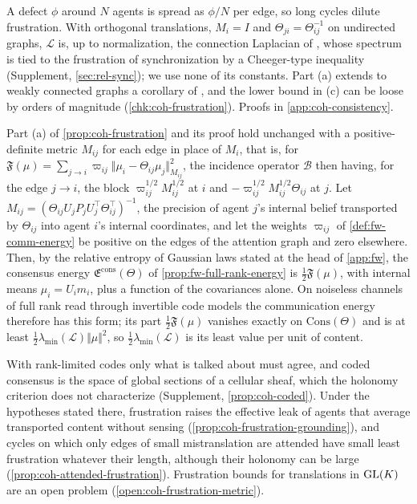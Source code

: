 A defect $\phi$ around $N$ agents is spread as $\phi/N$ per edge, so long cycles dilute frustration. With orthogonal translations, $M_i=I$ and $\Theta_{ji}=\Theta_{ij}^{-1}$ on undirected graphs, $\mathcal L$ is, up to normalization, the connection Laplacian of \citet{singer2012vector}, whose spectrum is tied to the frustration of synchronization by a Cheeger-type inequality (Supplement, \cref{sec:rel-sync}); we use none of its constants. Part (a) extends to weakly connected graphs a corollary of \citet{dennis2026magent}, and the lower bound in (c) can be loose by orders of magnitude (\cref{chk:coh-frustration}). Proofs in \cref{app:coh-consistency}.

Part (a) of \cref{prop:coh-frustration} and its proof hold unchanged with a positive-definite metric $M_{ij}$ for each edge in place of $M_i$, that is, for $\mathfrak F(\mu)=\sum_{j\to i}\varpi_{ij}\Vert\mu_i-\Theta_{ij}\mu_j\Vert^2_{M_{ij}}$, the incidence operator $\mathcal B$ then having, for the edge $j\to i$, the block $\varpi_{ij}^{1/2}M_{ij}^{1/2}$ at $i$ and $-\varpi_{ij}^{1/2}M_{ij}^{1/2}\Theta_{ij}$ at $j$. Let $M_{ij}=(\Theta_{ij}U_jP_jU_j^\top\Theta_{ij}^\top)^{-1}$, the precision of agent $j$'s internal belief transported by $\Theta_{ij}$ into agent $i$'s internal coordinates, and let the weights $\varpi_{ij}$ of \cref{def:fw-comm-energy} be positive on the edges of the attention graph and zero elsewhere. Then, by the relative entropy of Gaussian laws stated at the head of \cref{app:fw}, the consensus energy $\mathfrak E^{\mathrm{cons}}(\Theta)$ of \cref{prop:fw-full-rank-energy} is $\tfrac12\mathfrak F(\mu)$, with internal means $\mu_i=U_im_i$, plus a function of the covariances alone. On noiseless channels of full rank read through invertible code models the communication energy therefore has this form; its part $\tfrac12\mathfrak F(\mu)$ vanishes exactly on $\mathrm{Cons}(\Theta)$ and is at least $\tfrac12\lambda_{\min}(\mathcal L)\Vert\mu\Vert^2$, so $\tfrac12\lambda_{\min}(\mathcal L)$ is its least value per unit of content.

With rank-limited codes only what is talked about must agree, and coded consensus is the space of global sections of a cellular sheaf, which the holonomy criterion does not characterize (Supplement, \cref{prop:coh-coded}). Under the hypotheses stated there, frustration raises the effective leak of agents that average transported content without sensing (\cref{prop:coh-frustration-grounding}), and cycles on which only edges of small mistranslation are attended have small least frustration whatever their length, although their holonomy can be large (\cref{prop:coh-attended-frustration}). Frustration bounds for translations in $\mathrm{GL}(K)$ are an open problem (\cref{open:coh-frustration-metric}).

